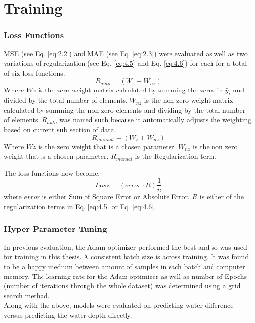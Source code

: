 \section{Training}
\subsubsection*{Loss Functions}
\label{training:loss}
MSE (see Eq. \ref{eq:2.2}) and MAE (see Eq. \ref{eq:2.3}) were evaluated as well as two variations of regularization (see Eq. \ref{eq:4.5} and Eq. \ref{eq:4.6}) for each for a total of six loss functions.
\begin{equation}
	\label{eq:4.5}
	 R_{auto} = (W_{z} + W_{nz})
\end{equation}
Where $W{z}$ is the zero weight matrix calculated by summing the zeros in $\hat{y}_{i}$ and divided by the total number of elements. $W_{nz}$ is the non-zero weight matrix calculated by summing the non zero elements and dividing by the total number of elements. $R_{auto}$ was named such because it automatically adjusts the weighting based on current sub section of data.
\begin{equation}
	\label{eq:4.6}
	R_{manual} = (W_{z} + W_{nz})
\end{equation}
Where $W{z}$ is the zero weight that is a chosen parameter. $W_{nz}$ is the non zero weight that is a chosen parameter. $R_{manual}$ is the Regularization term.

The loss functions now become,
\begin{equation}
	\label{4.7}
	Loss = (error \cdot R) \frac{1}{n}
\end{equation}
where $error$ is either Sum of Square Error or Absolute Error. $R$ is either of the regularization terms in Eq. \ref{eq:4.5} or Eq. \ref{eq:4.6}.

\subsubsection*{Hyper Parameter Tuning}
In previous evaluation, the Adam optimizer performed the best and so was used for training in this thesis. A consistent batch size is across training. It was found to be a happy medium between amount of samples in each batch and computer memory. The learning rate for the Adam optimizer as well as number of Epochs (number of iterations through the whole dataset) was determined using a grid search method. \\

Along with the above, models were evaluated on predicting water difference versus predicting the water depth directly.


